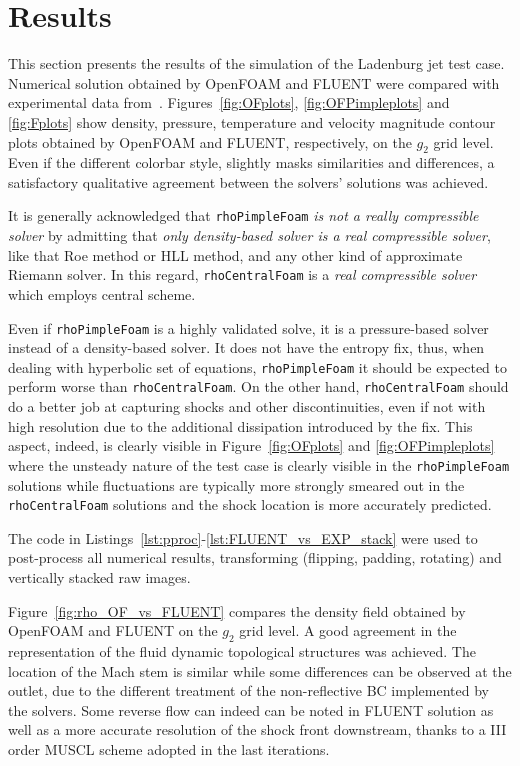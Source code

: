 \documentclass[12pt]{article}
\begin{document}

\section{Results}\label{sec:results}
This section presents the results of the simulation of the Ladenburg jet test case. Numerical solution obtained by OpenFOAM and FLUENT were compared with experimental data from~\cite{ladenburg1949interferometric}. Figures~\ref{fig:OFplots}, \ref{fig:OFPimpleplots} and \ref{fig:Fplots} show density, pressure, temperature and velocity magnitude contour plots obtained by OpenFOAM and FLUENT, respectively, on the $g_2$ grid level. Even if the different colorbar style, slightly masks similarities and differences, a satisfactory qualitative agreement between the solvers' solutions was achieved.

It is generally acknowledged that \texttt{rhoPimpleFoam} \textit{is not a really compressible solver} by admitting that \textit{only density-based solver is a real compressible solver}, like that Roe method or HLL method, and any other kind of approximate Riemann solver. In this regard, \texttt{rhoCentralFoam} is a \textit{real compressible solver} which employs central scheme. 

Even if \texttt{rhoPimpleFoam} is a highly validated solve, it is a pressure-based solver instead of a density-based solver. It does not have the entropy fix, thus, when dealing with hyperbolic set of equations, \texttt{rhoPimpleFoam} it should be expected to perform worse than \texttt{rhoCentralFoam}. On the other hand, \texttt{rhoCentralFoam} should do a better job at capturing shocks and other discontinuities, even if not with high resolution due to the additional dissipation introduced by the fix. This aspect, indeed, is clearly visible in Figure~\ref{fig:OFplots} and \ref{fig:OFPimpleplots}  where the unsteady nature of the test case is clearly visible in the \texttt{rhoPimpleFoam} solutions while fluctuations are typically more strongly smeared out in the \texttt{rhoCentralFoam} solutions and the shock location is more accurately predicted.

The code in Listings~\ref{lst:pproc}-\ref{lst:FLUENT_vs_EXP_stack} were used to post-process all numerical results, transforming (flipping, padding, rotating) and vertically stacked raw images.

Figure~\ref{fig:rho_OF_vs_FLUENT} compares the density field obtained by OpenFOAM and FLUENT on the $g_2$ grid level. A good agreement in the representation of the fluid dynamic topological structures was achieved. The location of the Mach stem is similar while some differences can be observed at the outlet, due to the different treatment of the non-reflective BC implemented by the solvers. Some reverse flow can indeed can be noted in FLUENT solution as well as a more accurate resolution of the shock front downstream, thanks to a III order MUSCL scheme adopted in the last iterations.
\end{document}
